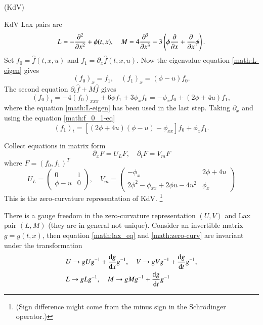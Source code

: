 \begin{example}
(KdV) 

KdV Lax pairs are 
\begin{equation*}
	L = - \pdv[2]{x} + \phi(t, x),\quad M = 4 \pdv[3]{x} - 3 \left(\phi \pdv{x} + \pdv{x} \phi\right).
\end{equation*}
Set $f_0 = \hat{f} (t, x, u)$ and $f_1 = \partial_x \hat{f}(t, x, u)$. Now the eigenvalue equation \eqref{math:L-eigen} gives
\begin{equation}
	(f_0)_x = f_1, \quad (f_1)_x = (\phi - u) f_0.
	\label{math:f_0_1-eq}
\end{equation}
The second equation $\partial_t \hat{f} + M \hat{f}$ gives
\begin{equation*}
	(f_0)_t = - 4 (f_0)_{x x x} + 6 \phi f_1 + 3 \phi_x f_0 = - \phi_x f_0 + (2 \phi + 4 u) f_1,
\end{equation*}
where the equation \eqref{math:L-eigen} has been used in the last step. Taking $\partial_x$ and using the equation \eqref{math:f_0_1-eq}
\begin{equation*}
	(f_1)_t = \left[ (2\phi + 4 u) (\phi - u) - \phi_{x x} \right]  f_0 + \phi_x f_1.
\end{equation*}

Collect equations in matrix form 
\begin{equation*}
	\partial_x F = U_L F, \quad 
	\partial_t F = V_m F
\end{equation*}
where $F = (f_0, f_1)^T$
\begin{equation*}
	U_L = \begin{pmatrix} 0 & 1 \\ \phi - u & 0 \end{pmatrix},\quad
	V_m = \begin{pmatrix} - \phi_x & 2\phi + 4 u \\ 2 \phi^2 - \phi_{x x} + 2\phi u - 4 u^2 & \phi_x \end{pmatrix}
\end{equation*}
This is the zero-curvature representation of KdV. \footnote{(Sign difference might come from the minus sign in the Schrödinger operator.)}
\end{example}

There is a gauge freedom in the zero-curvature representation $(U, V)$ and Lax pair $(L, M)$ (they are in general not unique). Consider an invertible matrix $g=g(t,x)$, then equation \eqref{math:lax_eq} and \eqref{math:zero-curv} are invariant under the transformation
\begin{align*}
	&U \rightarrow g U g^{-1} + \dv{g}{x} g^{-1},\quad  V \rightarrow g V g^{-1} + \dv{g}{t} g^{-1}, \\
	&L \rightarrow g L g^{-1},\quad  M \rightarrow g M g^{-1} + \dv{g}{t} g^{-1}
	\label{eq:}
\end{align*}
